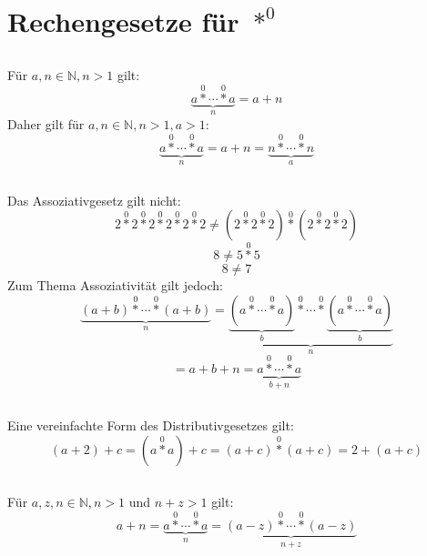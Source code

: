 \documentclass{article}
\begin{document}
\section{Rechengesetze f\"ur $\operatorname*{\ast}^0$\newline}

\subsection{}
F\"ur $a, n \in \mathbb{N}, n > 1$ gilt:
\[ \underbrace{a \operatorname*{\ast}^0 \dotsb \operatorname*{\ast}^0 a}_n = a+n \]
Daher gilt f\"ur $a, n \in \mathbb{N}, n > 1, a > 1$:
\[ \underbrace{a \operatorname*{\ast}^0 \dotsb \operatorname*{\ast}^0 a}_n =
   a+n = \underbrace{n \operatorname*{\ast}^0 \dotsb \operatorname*{\ast}^0 n}_a \]
\subsection{}
	Das Assoziativgesetz gilt nicht:
\[ 2 \operatorname*{\ast}^0 2 \operatorname*{\ast}^0 2 \operatorname*{\ast}^0 2 \operatorname*{\ast}^0 2 \operatorname*{\ast}^0 2 \neq
   \left(2 \operatorname*{\ast}^0 2 \operatorname*{\ast}^0 2\right) \operatorname*{\ast}^0 \left(2 \operatorname*{\ast}^0 2 \operatorname*{\ast}^0 2\right) \]
\[ 8 \neq 5 \operatorname*{\ast}^0 5 \]
\[ 8 \neq 7 \]
	Zum Thema Assoziativit\"at gilt jedoch:
\[  \underbrace{\left(a+b\right)\operatorname*{\ast}^0 \dotsb \operatorname*{\ast}^0 \left(a+b\right)}_n =
    \underbrace{\underbrace{\left(a\operatorname*{\ast}^0 \dotsb\operatorname*{\ast}^0 a\right)}_b \operatorname*{\ast}^0 \dotsb \operatorname*{\ast}^0\underbrace{\left(a\operatorname*{\ast}^0 \dotsb\operatorname*{\ast}^0 a\right)}_b }_n \]
\[ = a + b + n = \underbrace{a\operatorname*{\ast}^0 \dotsb \operatorname*{\ast}^0 a}_{b+n} \]
\subsection{}
	Eine vereinfachte Form des Distributivgesetzes gilt:
\[ \left(a + 2\right) + c = \left(a\operatorname*{\ast}^0a\right) + c = \left(a+c\right)\operatorname*{\ast}^0\left(a+c\right) = 2 + \left(a + c\right) \]
\subsection{}
F\"ur $a, z, n \in \mathbb{N}, n > 1$ und $n+z > 1$ gilt:
\[ a + n = \underbrace{a \operatorname*{\ast}^0 \dotsb \operatorname*{\ast}^0 a}_n =
   \underbrace{\left(a - z\right) \operatorname*{\ast}^0 \dotsb \operatorname*{\ast}^0 \left(a - z\right)}_{n+z} \]
\end{document}
